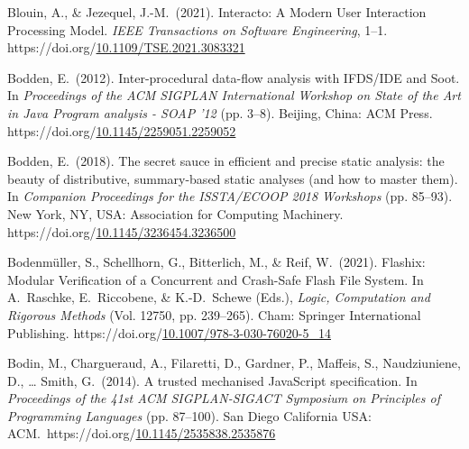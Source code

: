 \documentclass[12pt,twoside]{article}
\begin{document}
{\begin{thebibliography}{1079}
\mdbibitemlabel{}Blouin, A., \& Jezequel, J.-M.~(2021). Interacto: A Modern User Interaction Processing Model. \emph{IEEE Transactions on Software Engineering}, 1–1. https://doi.org/\href{https://dx.doi.org/10.1109/TSE.2021.3083321}{10.1109/TSE.2021.3083321}%

\mdbibitemlabel{}Bodden, E.~(2012). Inter-procedural data-flow analysis with IFDS/IDE and Soot. In \emph{Proceedings of the ACM SIGPLAN International Workshop on State of the Art in Java Program analysis - SOAP ’12} (pp. 3–8). Beijing, China: ACM Press. https://doi.org/\href{https://dx.doi.org/10.1145/2259051.2259052}{10.1145/2259051.2259052}%

\mdbibitemlabel{}Bodden, E.~(2018). The secret sauce in efficient and precise static analysis: the beauty of distributive, summary-based static analyses (and how to master them). In \emph{Companion Proceedings for the ISSTA/ECOOP 2018 Workshops} (pp. 85–93). New York, NY, USA: Association for Computing Machinery. https://doi.org/\href{https://dx.doi.org/10.1145/3236454.3236500}{10.1145/3236454.3236500}%

\mdbibitemlabel{}Bodenmüller, S., Schellhorn, G., Bitterlich, M., \& Reif, W.~(2021). Flashix: Modular Verification of a Concurrent and Crash-Safe Flash File System. In A.~Raschke, E.~Riccobene, \& K.-D.~Schewe (Eds.), \emph{Logic, Computation and Rigorous Methods} (Vol. 12750, pp. 239–265). Cham: Springer International Publishing. https://doi.org/\href{https://dx.doi.org/10.1007/978-3-030-76020-5_14}{10.1007/978-3-030-76020-5\_14}%

\mdbibitemlabel{}Bodin, M., Chargueraud, A., Filaretti, D., Gardner, P., Maffeis, S., Naudziuniene, D., … Smith, G.~(2014). A trusted mechanised JavaScript specification. In \emph{Proceedings of the 41st ACM SIGPLAN-SIGACT Symposium on Principles of Programming Languages} (pp. 87–100). San Diego California USA: ACM.~https://doi.org/\href{https://dx.doi.org/10.1145/2535838.2535876}{10.1145/2535838.2535876}%


\end{thebibliography}}
\end{document}

